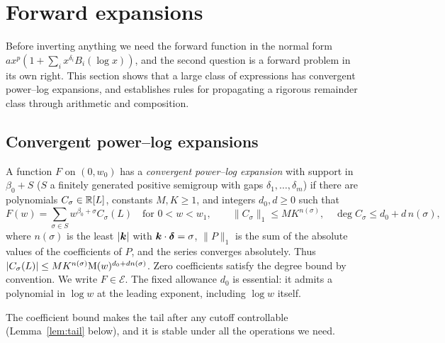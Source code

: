 \section{Forward expansions}
\label{sec:forward}

Before inverting anything we need the forward function in the normal form $ax^p(1+\sum_ix^{\delta_i}B_i(\log x))$, and the second question \cite{q2} is a forward problem in its own right. This section shows that a large class of expressions has convergent power--log expansions, and establishes rules for propagating a rigorous remainder class through arithmetic and composition.

\subsection{Convergent power--log expansions}

\begin{definition}
\label{def:pl-expansion}
A function $F$ on $(0,w_0)$ has a \emph{convergent power--log expansion} with support in $\beta_0+S$ ($S$ a finitely generated positive semigroup with gaps $\delta_1,\dots,\delta_m$) if there are polynomials $C_\sigma\in\mathbb R[L]$, constants $M,K\ge1$, and integers $d_0,d\ge0$ such that
\begin{equation}
 F(w)=\sum_{\sigma\in S}w^{\beta_0+\sigma}C_\sigma(L)\quad\text{for }0<w<w_1,
 \qquad \|C_\sigma\|_1\le M K^{n(\sigma)},\quad
 \deg C_\sigma\le d_0+d\,n(\sigma),
 \label{eq:pl-expansion}
\end{equation}
where $n(\sigma)$ is the least $|\boldsymbol k|$ with $\boldsymbol k\cdot\boldsymbol\delta=\sigma$, $\|P\|_1$ is the sum of the absolute values of the coefficients of $P$, and the series converges absolutely. Thus $|C_\sigma(L)|\le M K^{n(\sigma)}\mathrm M(w)^{d_0+dn(\sigma)}$. Zero coefficients satisfy the degree bound by convention. We write $F\in\mathcal E$. The fixed allowance $d_0$ is essential: it admits a polynomial in $\log w$ at the leading exponent, including $\log w$ itself.
\end{definition}

The coefficient bound makes the tail after any cutoff controllable (Lemma~\ref{lem:tail} below), and it is stable under all the operations we need.

